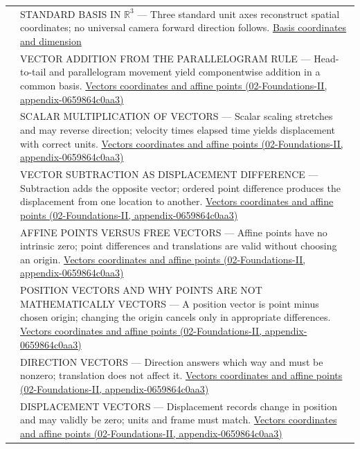{\begin{longtable}[]{@{}
  >{\raggedright\arraybackslash}p{}
  >{\raggedright\arraybackslash}p{}@{}}
517 & STANDARD BASIS IN \(\mathbb R^3\) --- Three standard unit axes reconstruct spatial coordinates; no universal camera forward direction follows. \hyperref[appendix-ce0341f7ea0d]{Basis coordinates and dimension} \\
518 & VECTOR ADDITION FROM THE PARALLELOGRAM RULE --- Head-to-tail and parallelogram movement yield componentwise addition in a common basis. \href{../02-Foundations-II/main.pdf\#nameddest=appendix-0659864c0aa3}{Vectors coordinates and affine points (02-Foundations-II, appendix-0659864c0aa3)} \\
519 & SCALAR MULTIPLICATION OF VECTORS --- Scalar scaling stretches and may reverse direction; velocity times elapsed time yields displacement with correct units. \href{../02-Foundations-II/main.pdf\#nameddest=appendix-0659864c0aa3}{Vectors coordinates and affine points (02-Foundations-II, appendix-0659864c0aa3)} \\
520 & VECTOR SUBTRACTION AS DISPLACEMENT DIFFERENCE --- Subtraction adds the opposite vector; ordered point difference produces the displacement from one location to another. \href{../02-Foundations-II/main.pdf\#nameddest=appendix-0659864c0aa3}{Vectors coordinates and affine points (02-Foundations-II, appendix-0659864c0aa3)} \\
521 & AFFINE POINTS VERSUS FREE VECTORS --- Affine points have no intrinsic zero; point differences and translations are valid without choosing an origin. \href{../02-Foundations-II/main.pdf\#nameddest=appendix-0659864c0aa3}{Vectors coordinates and affine points (02-Foundations-II, appendix-0659864c0aa3)} \\
522 & POSITION VECTORS AND WHY POINTS ARE NOT MATHEMATICALLY VECTORS --- A position vector is point minus chosen origin; changing the origin cancels only in appropriate differences. \href{../02-Foundations-II/main.pdf\#nameddest=appendix-0659864c0aa3}{Vectors coordinates and affine points (02-Foundations-II, appendix-0659864c0aa3)} \\
523 & DIRECTION VECTORS --- Direction answers which way and must be nonzero; translation does not affect it. \href{../02-Foundations-II/main.pdf\#nameddest=appendix-0659864c0aa3}{Vectors coordinates and affine points (02-Foundations-II, appendix-0659864c0aa3)} \\
524 & DISPLACEMENT VECTORS --- Displacement records change in position and may validly be zero; units and frame must match. \href{../02-Foundations-II/main.pdf\#nameddest=appendix-0659864c0aa3}{Vectors coordinates and affine points (02-Foundations-II, appendix-0659864c0aa3)} \\

\end{longtable}}
